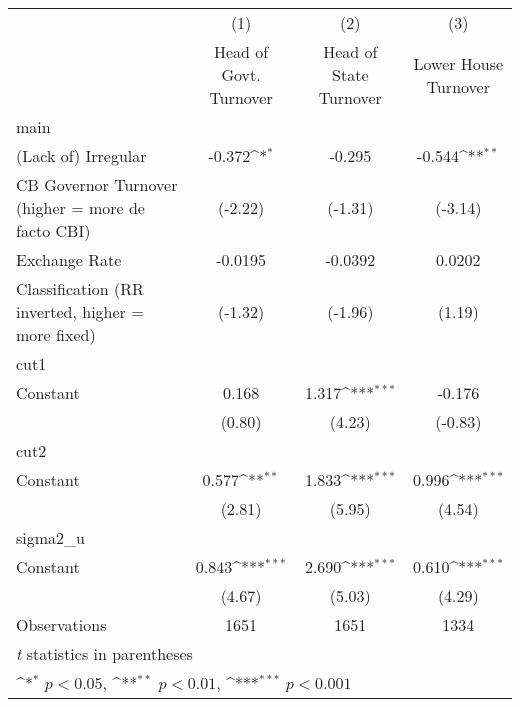 {
\def\sym#1{\ifmmode^{#1}\else\(^{#1}\)\fi}
\begin{tabular}{l*{3}{c}}
\hline\hline
                    &\multicolumn{1}{c}{(1)}&\multicolumn{1}{c}{(2)}&\multicolumn{1}{c}{(3)}\\
                    &\multicolumn{1}{c}{Head of Govt. Turnover}&\multicolumn{1}{c}{Head of State Turnover}&\multicolumn{1}{c}{Lower House Turnover}\\
\hline
main                &                     &                     &                     \\
(Lack of) Irregular &      -0.372\sym{*}  &      -0.295         &      -0.544\sym{**} \\
CB Governor Turnover (higher = more de facto CBI)&     (-2.22)         &     (-1.31)         &     (-3.14)         \\
[1em]
Exchange Rate       &     -0.0195         &     -0.0392         &      0.0202         \\
Classification (RR inverted, higher = more fixed)&     (-1.32)         &     (-1.96)         &      (1.19)         \\
\hline
cut1                &                     &                     &                     \\
Constant            &       0.168         &       1.317\sym{***}&      -0.176         \\
                    &      (0.80)         &      (4.23)         &     (-0.83)         \\
\hline
cut2                &                     &                     &                     \\
Constant            &       0.577\sym{**} &       1.833\sym{***}&       0.996\sym{***}\\
                    &      (2.81)         &      (5.95)         &      (4.54)         \\
\hline
sigma2\_u            &                     &                     &                     \\
Constant            &       0.843\sym{***}&       2.690\sym{***}&       0.610\sym{***}\\
                    &      (4.67)         &      (5.03)         &      (4.29)         \\
\hline
Observations        &        1651         &        1651         &        1334         \\
\hline\hline
\multicolumn{4}{l}{\footnotesize \textit{t} statistics in parentheses}\\
\multicolumn{4}{l}{\footnotesize \sym{*} \(p<0.05\), \sym{**} \(p<0.01\), \sym{***} \(p<0.001\)}\\
\end{tabular}
}
